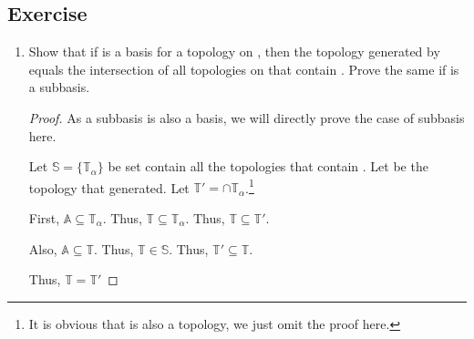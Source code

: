 \subsection{Exercise}

      \begin{enumerate}
            \item Show that if  is a basis for a topology on , then the topology generated by  equals the intersection of all topologies on  that contain . Prove the same if  is a subbasis.
            
            \begin{proof}
                  As a subbasis is also a basis, we will directly prove the case of subbasis here.

                  Let $ \mathbb{S} = \{ \mathbb{T}_{\alpha} \} $ be set contain all the topologies that contain .
                  Let  be the topology that  generated.
                  Let $ \displaystyle \mathbb{T}' = \cap\mathbb{T}_{\alpha} $.\footnote{
                        It is obvious that  is also a topology, we just omit the proof here.
                  }

                  First, $ \mathbb{A} \subseteq \mathbb{T}_{\alpha} $.
                  Thus, $ \mathbb{T} \subseteq \mathbb{T}_{\alpha} $.
                  Thus, $ \mathbb{T} \subseteq \mathbb{T}' $.

                  Also, $ \mathbb{A} \subseteq \mathbb{T} $.
                  Thus, $ \mathbb{T} \in \mathbb{S} $.
                  Thus, $ \mathbb{T}' \subseteq \mathbb{T} $.

                  Thus, $ \mathbb{T} = \mathbb{T}' $
            \end{proof}


      \end{enumerate}